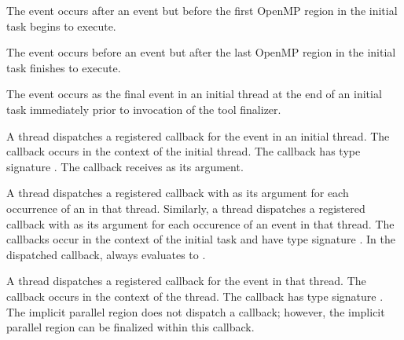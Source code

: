 The  event occurs after an  event
but before the first OpenMP region in the initial task begins to execute.

The  event occurs before an  event
but after the last OpenMP region in the initial task finishes to execute.

The  event occurs as the final event in an initial thread 
at the end of an initial task immediately prior to invocation of the tool finalizer.

\tools

A thread dispatches a registered 
callback for the  event in an initial thread.
The callback occurs in the context of the initial thread.
The callback has type signature .
The callback receives  as its  argument.

A thread dispatches a registered 
callback with  as its  argument
for each occurrence of an  in that thread.
Similarly, a thread dispatches a registered 
callback with  as its  argument
for each occurence of an  event in that thread. 
The callbacks occur in the context of the initial task and have type 
signature . In the dispatched
callback,  always evaluates to
.

A thread dispatches a registered 
callback for the  event in that thread.
The callback occurs in the context of the thread.  The callback has type signature
. The implicit parallel region does not dispatch 
a  callback; however, the implicit parallel region 
can be finalized within this  callback.

